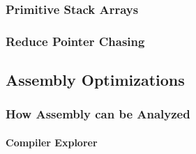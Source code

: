 \subsubsection{Primitive Stack Arrays}
\subsubsection{Reduce Pointer Chasing}
\subsection{Assembly Optimizations}
\subsubsection{How Assembly can be Analyzed}
\paragraph{Compiler Explorer}
